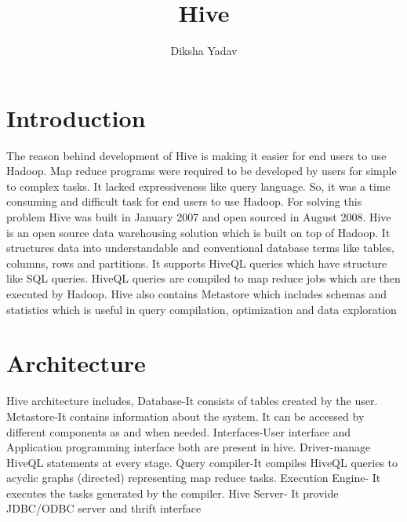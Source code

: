 \documentclass[9pt,twocolumn,twoside]{../../styles/osajnl}
\title{Hive}
\author[1,*, +]{Diksha Yadav}
\affil[1]{School of Informatics and Computing, Bloomington, IN 47408, U.S.A.}
\affil[*]{Corresponding authors: yadavd@umail.iu.edu}
\affil[+]{HID - S17-IR-2044}
\begin{document}
\maketitle

\section{Introduction}
The reason behind development of Hive is making it easier for end users to use Hadoop. Map reduce programs were required to be developed by users for simple to complex tasks. It lacked expressiveness like query language. So, it was a time consuming and difficult task for end users to use Hadoop. For solving this problem Hive was built in January 2007 and open sourced in August 2008.
Hive is an open source data warehousing solution which is built on top of Hadoop. It structures data into understandable and conventional database terms like tables, columns, rows and partitions. It supports HiveQL queries which have structure like SQL queries. HiveQL queries are compiled to map reduce jobs which are then executed by Hadoop. Hive also contains Metastore which includes schemas and statistics which is useful in query compilation, optimization and data exploration\cite{wk}

\section{Architecture}
Hive architecture includes,
Database-It consists of tables created by the user.
Metastore-It contains information about the system. It can be accessed by different components as and when needed.
Interfaces-User interface and Application programming interface both are present in hive.
Driver-manage HiveQL statements at every stage.
Query compiler-It compiles HiveQL queries to acyclic graphs (directed) representing map reduce tasks.
Execution Engine- It executes the tasks generated by the compiler.
Hive Server- It provide JDBC/ODBC server and thrift interface\cite{td}
\end{document}
